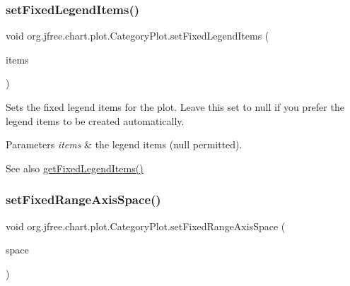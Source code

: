 \subsubsection{\texorpdfstring{set\+Fixed\+Legend\+Items()}{setFixedLegendItems()}}
{\footnotesize\ttfamily void org.\+jfree.\+chart.\+plot.\+Category\+Plot.\+set\+Fixed\+Legend\+Items (\begin{DoxyParamCaption}\item[{\mbox{\hyperlink{classorg_1_1jfree_1_1chart_1_1_legend_item_collection}{Legend\+Item\+Collection}}}]{items }\end{DoxyParamCaption})}

Sets the fixed legend items for the plot. Leave this set to {\ttfamily null} if you prefer the legend items to be created automatically.


\begin{DoxyParams}{Parameters}
{\em items} & the legend items ({\ttfamily null} permitted).\\
\hline
\end{DoxyParams}
\begin{DoxySeeAlso}{See also}
\mbox{\hyperlink{classorg_1_1jfree_1_1chart_1_1plot_1_1_category_plot_a46c3a569343408d1e941b99d9659b04d}{get\+Fixed\+Legend\+Items()}} 
\end{DoxySeeAlso}
\mbox{\label{classorg_1_1jfree_1_1chart_1_1plot_1_1_category_plot_a281491a8dbacd4f5a2e1cf156850d6a0}} 
\subsubsection{\texorpdfstring{set\+Fixed\+Range\+Axis\+Space()}{setFixedRangeAxisSpace()}\hspace{0.1cm}{\footnotesize\ttfamily [1/2]}}
{\footnotesize\ttfamily void org.\+jfree.\+chart.\+plot.\+Category\+Plot.\+set\+Fixed\+Range\+Axis\+Space (\begin{DoxyParamCaption}\item[{\mbox{\hyperlink{classorg_1_1jfree_1_1chart_1_1axis_1_1_axis_space}{Axis\+Space}}}]{space }\end{DoxyParamCaption})}

